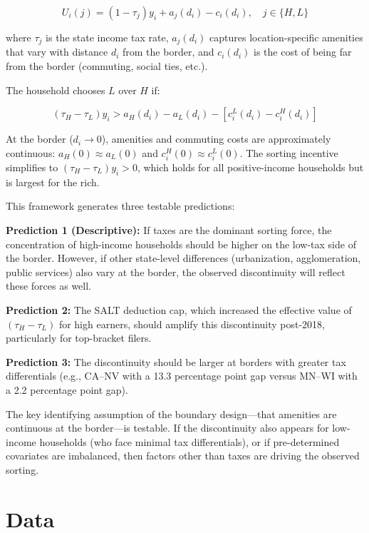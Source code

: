 \documentclass[12pt]{article}
\begin{document}
\begin{equation}
U_i(j) = (1 - \tau_j) y_i + a_j(d_i) - c_i(d_i), \quad j \in \{H, L\}
\end{equation}

\noindent where $\tau_j$ is the state income tax rate, $a_j(d_i)$ captures location-specific amenities that vary with distance $d_i$ from the border, and $c_i(d_i)$ is the cost of being far from the border (commuting, social ties, etc.).

The household chooses $L$ over $H$ if:

\begin{equation}
(\tau_H - \tau_L) y_i > a_H(d_i) - a_L(d_i) - [c_i^L(d_i) - c_i^H(d_i)]
\end{equation}

At the border ($d_i \to 0$), amenities and commuting costs are approximately continuous: $a_H(0) \approx a_L(0)$ and $c_i^H(0) \approx c_i^L(0)$. The sorting incentive simplifies to $(\tau_H - \tau_L) y_i > 0$, which holds for all positive-income households but is largest for the rich.

This framework generates three testable predictions:

\textbf{Prediction 1 (Descriptive):} If taxes are the dominant sorting force, the concentration of high-income households should be higher on the low-tax side of the border. However, if other state-level differences (urbanization, agglomeration, public services) also vary at the border, the observed discontinuity will reflect these forces as well.

\textbf{Prediction 2:} The SALT deduction cap, which increased the effective value of $(\tau_H - \tau_L)$ for high earners, should amplify this discontinuity post-2018, particularly for top-bracket filers.

\textbf{Prediction 3:} The discontinuity should be larger at borders with greater tax differentials (e.g., CA--NV with a 13.3 percentage point gap versus MN--WI with a 2.2 percentage point gap).

The key identifying assumption of the boundary design---that amenities are continuous at the border---is testable. If the discontinuity also appears for low-income households (who face minimal tax differentials), or if pre-determined covariates are imbalanced, then factors other than taxes are driving the observed sorting.


\section{Data}
\label{sec:data}
\end{document}
